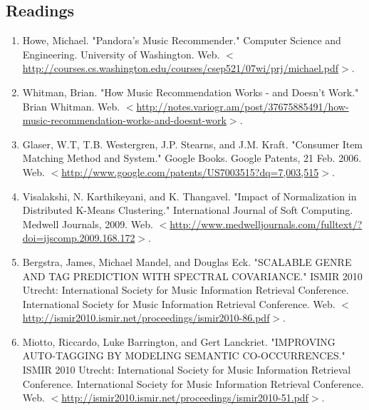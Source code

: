 \documentclass[12pt]{article}
\begin{document}
\subsection{Readings}
\label{subsec:readings}
\begin{enumerate}
    \item Howe, Michael. "Pandora's Music Recommender." Computer Science and Engineering. University of Washington. Web. $<$\href{http://courses.cs.washington.edu/courses/csep521/07wi/prj/michael.pdf}{http://courses.cs.washington.edu/courses/csep521/07wi/prj/michael.pdf}$>$.\vspace{-1ex}
    
    \item Whitman, Brian. "How Music Recommendation Works - and Doesn't Work." Brian Whitman. Web. $<$\href{http://notes.variogr.am/post/37675885491/how-music-recommendation-works-and-doesnt-work}{http://notes.variogr.am/post/37675885491/how-music-recommendation-works-and-doesnt-work}$>$.\vspace{-1ex}

    \item Glaser, W.T, T.B. Westergren, J.P. Stearns, and J.M. Kraft. "Consumer Item Matching Method and System." Google Books. Google Patents, 21 Feb. 2006. Web. $<$\href{http://www.google.com/patents/US7003515?dq=7,003,515}{http://www.google.com/patents/US7003515?dq=7,003,515}$>$.\vspace{-1ex}
    
    \item Visalakshi, N. Karthikeyani, and K. Thangavel. "Impact of Normalization in Distributed K-Means Clustering." International Journal of Soft Computing. Medwell Journals, 2009. Web. $<$\href{http://www.medwelljournals.com/fulltext/?doi=ijscomp.2009.168.172}{http://www.medwelljournals.com/fulltext/?doi=ijscomp.2009.168.172}$>$.\vspace{-1ex}
    
    \item Bergstra, James, Michael Mandel, and Douglas Eck. "SCALABLE GENRE AND TAG PREDICTION WITH SPECTRAL COVARIANCE." ISMIR 2010 Utrecht: International Society for Music Information Retrieval Conference. International Society for Music Information Retrieval Conference. Web. $<$\href{http://ismir2010.ismir.net/proceedings/ismir2010-86.pdf}{http://ismir2010.ismir.net/proceedings/ismir2010-86.pdf}$>$.\vspace{-1ex}
    
    \item Miotto, Riccardo, Luke Barrington, and Gert Lanckriet. "IMPROVING AUTO-TAGGING BY MODELING SEMANTIC CO-OCCURRENCES." ISMIR 2010 Utrecht: International Society for Music Information Retrieval Conference. International Society for Music Information Retrieval Conference. Web. $<$\href{http://ismir2010.ismir.net/proceedings/ismir2010-51.pdf}{http://ismir2010.ismir.net/proceedings/ismir2010-51.pdf}$>$.\vspace{-1ex}
    

\end{enumerate}
\end{document}
